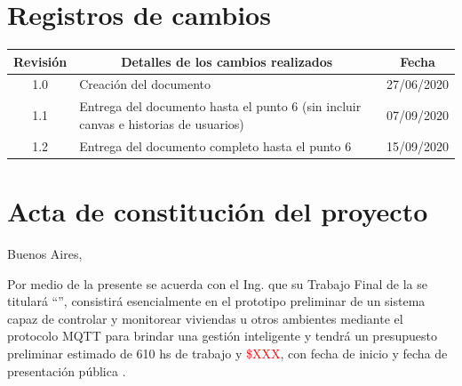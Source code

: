 \documentclass[11pt]{charter}
\begin{document}
\maketitle
\thispagestyle{empty}
\pagebreak


\thispagestyle{empty}
{\setlength{\parskip}{0pt}
\tableofcontents{}
}
\pagebreak


\section{Registros de cambios}
\label{sec:registro}


\begin{table}[ht]
\label{tab:registro}
\centering
\begin{tabularx}{\linewidth}{@{}|c|X|c|@{}}
\hline
\rowcolor[HTML]{C0C0C0} 
Revisión & \multicolumn{1}{c|}{\cellcolor[HTML]{C0C0C0}Detalles de los cambios realizados} & Fecha      \\ \hline
1.0      & Creación del documento                                          & 27/06/2020 \\ \hline
1.1      & Entrega del documento hasta el punto 6 \newline
			(sin incluir canvas e historias de usuarios)            & 07/09/2020 \\ \hline
1.2      & Entrega del documento completo hasta el punto 6          & 15/09/2020 \\ \hline
\end{tabularx}
\end{table}

\pagebreak



\section{Acta de constitución del proyecto}
\label{sec:acta}

\begin{flushright}
Buenos Aires, \fechaInicioName
\end{flushright}

\vspace{2cm}

Por medio de la presente se acuerda con el Ing. \authorname\hspace{1px} que su Trabajo Final de la \degreename\hspace{1px} se titulará ``\ttitle'', consistirá esencialmente en el prototipo preliminar de un sistema capaz de controlar y monitorear viviendas u otros ambientes mediante el protocolo MQTT para brindar una gestión inteligente y tendrá un presupuesto preliminar estimado de 610 hs de trabajo y \textcolor{red}{\$XXX}, con fecha de inicio \fechaInicioName\hspace{1px} y fecha de presentación pública \fechaFinalName.
\end{document}
